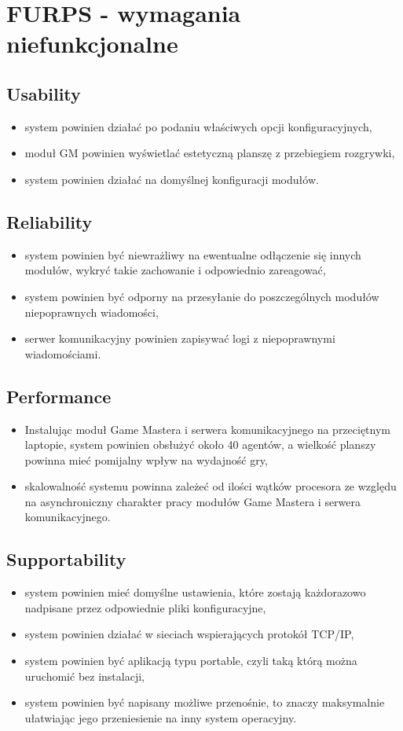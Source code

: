 \documentclass[Dokumentacja.tex]{subfiles}
\begin{document}
\section{FURPS - wymagania niefunkcjonalne}
\subsection{Usability}
\begin{itemize}
    \item system powinien działać po podaniu właściwych opcji konfiguracyjnych,
    \item moduł GM powinien wyświetlać estetyczną planszę z przebiegiem rozgrywki,
    \item system powinien działać na domyślnej konfiguracji modułów.
\end{itemize}

\subsection{Reliability}
\begin{itemize}
    \item system powinien być niewrażliwy na ewentualne odłączenie się innych modułów,
    wykryć takie zachowanie i odpowiednio zareagować,
    \item system powinien być odporny na przesyłanie do poszczególnych modułów niepoprawnych wiadomości,
    \item serwer komunikacyjny powinien zapisywać logi z niepoprawnymi wiadomościami.
\end{itemize}

\subsection{Performance}
\begin{itemize}
    \item Instalując moduł Game Mastera i serwera komunikacyjnego na przeciętnym laptopie, system powinien obsłużyć około 40 agentów,
    a wielkość planszy powinna mieć pomijalny wpływ na wydajność gry,
    \item skalowalność systemu powinna zależeć od ilości wątków procesora ze względu na asynchroniczny charakter pracy modułów
    Game Mastera i serwera komunikacyjnego.
\end{itemize}

\subsection{Supportability}
\begin{itemize}
    \item system powinien mieć domyślne ustawienia, które zostają każdorazowo nadpisane przez odpowiednie pliki konfiguracyjne,
    \item system powinien działać w sieciach wspierających protokół TCP/IP,
    \item system powinien być aplikacją typu portable, czyli taką którą można uruchomić bez instalacji,
    \item system powinien być napisany możliwe przenośnie, to znaczy maksymalnie ułatwiając jego przeniesienie na inny system operacyjny.
\end{itemize}
\end{document}
